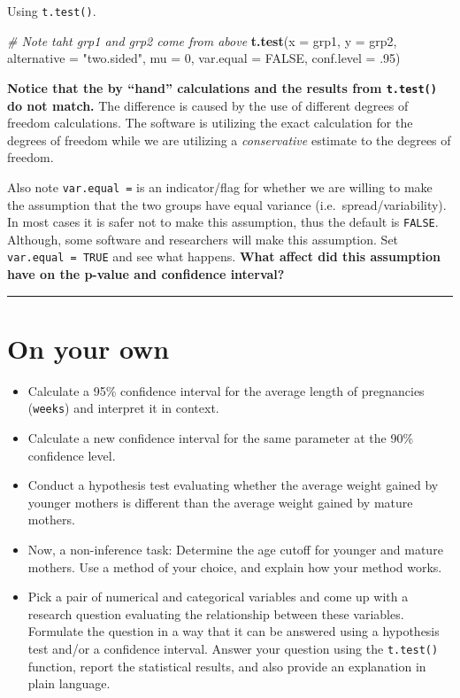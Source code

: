 \documentclass[]{book}
\newenvironment{Shaded}{\begin{snugshade}}{\end{snugshade}}
\newcommand{\CommentTok}[1]{\textcolor[rgb]{0.56,0.35,0.01}{\textit{#1}}}
\newcommand{\DataTypeTok}[1]{\textcolor[rgb]{0.13,0.29,0.53}{#1}}
\newcommand{\DecValTok}[1]{\textcolor[rgb]{0.00,0.00,0.81}{#1}}
\newcommand{\FloatTok}[1]{\textcolor[rgb]{0.00,0.00,0.81}{#1}}
\newcommand{\KeywordTok}[1]{\textcolor[rgb]{0.13,0.29,0.53}{\textbf{#1}}}
\newcommand{\NormalTok}[1]{#1}
\newcommand{\OtherTok}[1]{\textcolor[rgb]{0.56,0.35,0.01}{#1}}
\newcommand{\StringTok}[1]{\textcolor[rgb]{0.31,0.60,0.02}{#1}}
\theoremstyle{definition}
\theoremstyle{definition}
\theoremstyle{definition}
\theoremstyle{remark}
\begin{document}
Using \texttt{t.test()}.

\begin{Shaded}
\begin{Highlighting}[]
\CommentTok{# Note taht grp1 and grp2 come from above}
\KeywordTok{t.test}\NormalTok{(}\DataTypeTok{x =}\NormalTok{ grp1, }\DataTypeTok{y =}\NormalTok{ grp2, }\DataTypeTok{alternative =} \StringTok{"two.sided"}\NormalTok{, }\DataTypeTok{mu =} \DecValTok{0}\NormalTok{, }\DataTypeTok{var.equal =} \OtherTok{FALSE}\NormalTok{, }\DataTypeTok{conf.level =} \FloatTok{.95}\NormalTok{)}
\end{Highlighting}
\end{Shaded}

\textbf{Notice that the by ``hand'' calculations and the results from
\texttt{t.test()} do not match.} The difference is caused by the use of
different degrees of freedom calculations. The software is utilizing the
exact calculation for the degrees of freedom while we are utilizing a
\emph{conservative} estimate to the degrees of freedom.

Also note \texttt{var.equal\ =} is an indicator/flag for whether we are
willing to make the assumption that the two groups have equal variance
(i.e.~spread/variability). In most cases it is safer not to make this
assumption, thus the default is \texttt{FALSE}. Although, some software
and researchers will make this assumption. Set
\texttt{var.equal\ =\ TRUE} and see what happens. \textbf{What affect
did this assumption have on the p-value and confidence interval?}

\begin{center}\rule{0.5\linewidth}{\linethickness}\end{center}

\hypertarget{on-your-own-5}{%
\section{On your own}\label{on-your-own-5}}

\begin{itemize}
\item
  Calculate a 95\% confidence interval for the average length of
  pregnancies (\texttt{weeks}) and interpret it in context.
\item
  Calculate a new confidence interval for the same parameter at the 90\%
  confidence level.
\item
  Conduct a hypothesis test evaluating whether the average weight gained
  by younger mothers is different than the average weight gained by
  mature mothers.
\item
  Now, a non-inference task: Determine the age cutoff for younger and
  mature mothers. Use a method of your choice, and explain how your
  method works.
\item
  Pick a pair of numerical and categorical variables and come up with a
  research question evaluating the relationship between these variables.
  Formulate the question in a way that it can be answered using a
  hypothesis test and/or a confidence interval. Answer your question
  using the \texttt{t.test()} function, report the statistical results,
  and also provide an explanation in plain language.
\end{itemize}
\end{document}
